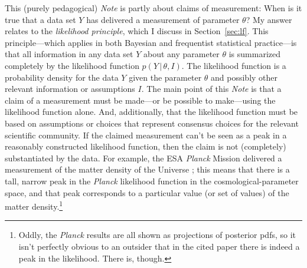 \documentclass{article}
\newcommand{\documentname}{\textsl{Note}}
\newcommand{\sectionname}{Section}
\newcommand{\secref}[1]{\sectionname~\ref{#1}}
\newcommand{\given}{\,|\,}
\begin{document}
This (purely pedagogical) \documentname{} is partly about claims of measurement:
When is it true that a data set $Y$ has delivered a measurement of parameter $\theta$?
My answer relates to the \emph{likelihood principle}, which I discuss in \secref{sec:lf}.
This principle---which applies in both Bayesian and frequentist statistical practice---is that all information in any data set $Y$ about any parameter $\theta$ is summarized completely by the likelihood function $p(Y\given\theta, I)$.
The likelihood function is a probability density for the data $Y$ given the parameter $\theta$ and possibly other relevant information or assumptions $I$.
The main point of this \documentname{} is that a claim of a measurement must be made---or be possible to make---using the likelihood function alone.
And, additionally, that the likelihood function must be based on assumptions or choices that represent consensus choices for the relevant scientific community.
If the claimed measurement can't be seen as a peak in a reasonably constructed likelihood function, then the claim is not (completely) substantiated by the data.
For example, the ESA \textsl{Planck} Mission \cite{Planck} delivered a measurement of the matter density of the Universe \cite{planck18};
this means that there is a tall, narrow peak in the \textsl{Planck} likelihood function in the cosmological-parameter space, and that peak corresponds to a particular value (or set of values) of the matter density.\footnote{Oddly, the \textsl{Planck} results are all shown as projections of posterior pdfs, so it isn't perfectly obvious to an outsider that in the cited paper \cite{planck18} there is indeed a peak in the likelihood. There is, though.}
\end{document}
